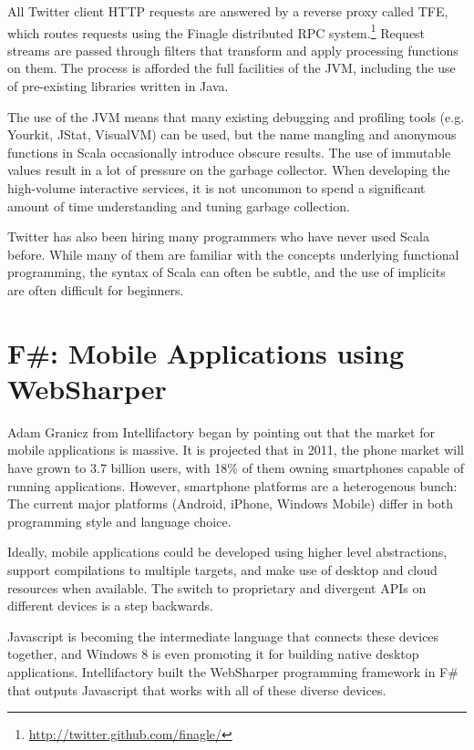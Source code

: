 \documentclass{jfp1}
\begin{document}
All Twitter client HTTP requests are answered by a reverse proxy called TFE, which
routes requests using the Finagle distributed RPC
system.\footnote{\url{http://twitter.github.com/finagle/}} Request streams are passed through filters that
transform and apply processing functions on them.  The process is
afforded the full facilities of the JVM, including the use of
pre-existing libraries written in Java.

The use of the JVM means that many existing debugging and profiling
tools (e.g.  Yourkit, JStat, VisualVM) can be used, but the name
mangling and anonymous functions in Scala occasionally introduce obscure
results.  The use of immutable values result in a lot of pressure on the
garbage collector. When developing the high-volume interactive services,
it is not uncommon to spend a significant amount of time understanding
and tuning garbage collection.

Twitter has also been hiring many programmers who have never used Scala
before.  While many of them are familiar with the concepts underlying
functional programming, the syntax of Scala can often be subtle, and the
use of implicits are often difficult for beginners.

\section{F\#: Mobile Applications using WebSharper}

Adam Granicz from Intellifactory began by pointing out that the market
for mobile applications is massive.  It is projected that in 2011, the phone market will have grown to 3.7 billion users, with 18\% of them owning smartphones capable of running applications.  However, smartphone platforms are a heterogenous bunch:
The current major platforms (Android, iPhone, Windows Mobile) differ in
both programming style and language choice.

Ideally, mobile applications could be developed using higher level
abstractions, support compilations to multiple targets, and make use of
desktop and cloud resources when available. The switch to proprietary
and divergent APIs on different devices is a step backwards.

Javascript is becoming the intermediate language that connects these
devices together, and Windows 8 is even promoting it for building native
desktop applications. Intellifactory built the WebSharper programming
framework in F\# that outputs Javascript that works with all of these
diverse devices.
\end{document}
